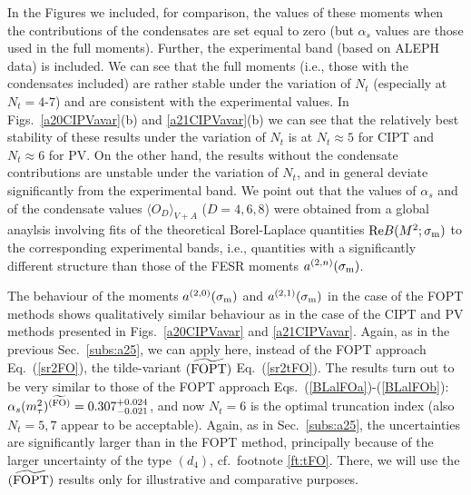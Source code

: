 \documentclass[aps,nofootinbib,showkeys,noshowpacs,preprintnumbers,amsmath,amssymb]{revtex4}
\newcommand{\sm}{{\sigma_{\rm m}}}
\begin{document}
In the Figures we included, for comparison, the values of these moments when the contributions of the condensates are set equal to zero (but $\alpha_s$ values are those used in the full moments). Further, the experimental band (based on ALEPH data) is included. We can see that the full moments (i.e., those with the condensates included) are rather stable under the variation of $N_t$ (especially at $N_t=4$-$7$) and are consistent with the experimental values. In Figs.~\ref{a20CIPVavar}(b) and \ref{a21CIPVavar}(b) we can see that the relatively best stability of these results under the variation of $N_t$ is at $N_t \approx 5$ for CIPT and $N_t \approx 6$ for PV. On the other hand, the results without the condensate contributions are unstable under the variation of $N_t$, and in general deviate significantly from the experimental band. We point out that the values of $\alpha_s$ and of the condensate values $\langle O_D \rangle_{V+A}$ ($D=4,6,8$) were obtained from a global anaylsis involving fits of the theoretical Borel-Laplace quantities ${\rm Re} B(M^2; \sm)$ to the corresponding experimental bands, i.e., quantities with a significantly different structure than those of the FESR moments $a^{(2,n)}(\sm)$.

The behaviour of the moments $a^{(2,0)}(\sm)$ and $a^{(2,1)}(\sm)$ in the case of the FOPT methods shows qualitatively similar behaviour as in the case of the CIPT and PV methods presented in Figs.~\ref{a20CIPVavar} and \ref{a21CIPVavar}. Again, as in the previous Sec.~\ref{subs:a25}, we can apply here, instead of the FOPT approach Eq.~(\ref{sr2FO}), the tilde-variant $({\widetilde{\rm FOPT}})$ Eq.~(\ref{sr2tFO}). The results turn out to be very similar to those of the FOPT approach Eqs.~(\ref{BLalFOa})-(\ref{BLalFOb}):  $\alpha_s(m_{\tau}^2)^{({\widetilde{\rm FO}})} = 0.307^{+0.024}_{-0.021}$, and now $N_t=6$ is the optimal truncation index (also $N_t=5,7$ appear to be acceptable). Again, as in Sec.~\ref{subs:a25}, the uncertainties are significantly larger than in the FOPT method, principally because  of the larger uncertainty of the type $(d_4)$, cf.~footnote \ref{ft:tFO}. There, we will use the $({\widetilde{\rm FOPT}})$ results only for illustrative and comparative purposes.
\end{document}
